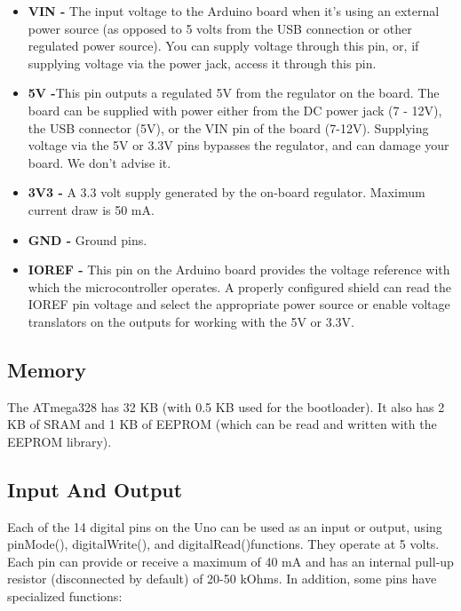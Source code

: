 \documentclass[a4paper, 12pt, notitlepage]{report}
\begin{document}
\begin{itemize}
\item \textbf{VIN -} The input voltage to the Arduino board when it's using an external power source (as opposed to 5 volts from the USB connection or other regulated power source). You can supply voltage through this pin, or, if supplying voltage via the power jack, access it through this pin.
\item \textbf{5V -}This pin outputs a regulated 5V from the regulator on the board. The board can be supplied with power either from the DC power jack (7 - 12V), the USB connector (5V), or the VIN pin of the board (7-12V). Supplying voltage via the 5V or 3.3V pins bypasses the regulator, and can damage your board. We don't advise it.
\item	\textbf{3V3 -} A 3.3 volt supply generated by the on-board regulator. Maximum current draw is 50 mA.
\item	\textbf{GND -} Ground pins.
\item	\textbf{IOREF -} This pin on the Arduino board provides the voltage reference with which the microcontroller operates. A properly configured shield can read the IOREF pin voltage and select the appropriate power source or enable voltage translators on the outputs for working with the 5V or 3.3V.

\end{itemize}

\subsection{Memory}

The ATmega328 has 32 KB (with 0.5 KB used for the bootloader). It also has 2 KB of SRAM and 1 KB of EEPROM (which can be read and written with the EEPROM library).

\subsection{Input And Output}

Each of the 14 digital pins on the Uno can be used as an input or output, using pinMode(), digitalWrite(), and digitalRead()functions. They operate at 5 volts. Each pin can provide or receive a maximum of 40 mA and has an internal pull-up resistor (disconnected by default) of 20-50 kOhms. In addition, some pins have specialized functions:\\
\end{document}
